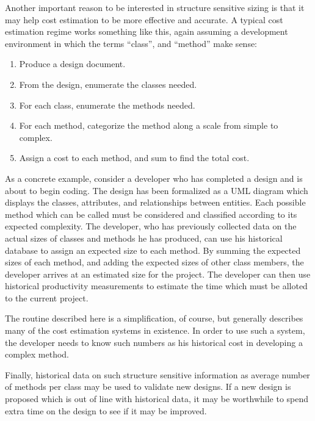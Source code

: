 Another important reason to be interested in structure sensitive sizing is
that it may help cost estimation to be more effective and accurate.  A
typical cost estimation regime \cite{Humphrey,Walston,Laranjeira90} works
something like this, again assuming a development environment in which the
terms ``class'', and ``method'' make sense:

\begin{enumerate}

\item Produce a design document.

\item From the design, enumerate the classes needed.

\item For each class, enumerate the methods needed.

\item For each method, categorize the method along a scale from simple 
to complex.

\item Assign a cost to each method, and sum to find the total cost.

\end{enumerate}

As a concrete example, consider a developer who has completed a design and
is about to begin coding.  The design has been formalized as a UML diagram
which displays the classes, attributes, and relationships between entities.
Each possible method which can be called must be considered and classified
according to its expected complexity.  The developer, who has previously
collected data on the actual sizes of classes and methods he has produced,
can use his historical database to assign an expected size to each method.
By summing the expected sizes of each method, and adding the expected sizes
of other class members, the developer arrives at an estimated size for the
project.  The developer can then use historical productivity measurements
to estimate the time which must be alloted to the current project.

The routine described here is a simplification, of course, but
generally describes many of the cost estimation systems in existence.
In order to use such a system, the developer needs to know such numbers 
as his historical cost in developing a complex method.

Finally, historical data on such structure sensitive information as
average number of methods per class may be used to validate new
designs.  If a new design is proposed which is out of line with
historical data, it may be worthwhile to spend extra time on the
design to see if it may be improved.

